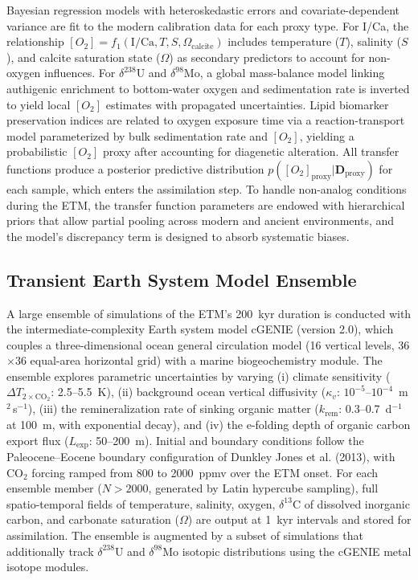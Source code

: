 \documentclass{article}
\begin{document}
Bayesian regression models with heteroskedastic errors and covariate-dependent variance are fit to the modern calibration data for each proxy type.
For I/Ca, the relationship $[O_2] = f_1(\text{I/Ca}, T, S, \Omega_{\text{calcite}})$ includes temperature ($T$), salinity ($S$), and calcite saturation state ($\Omega$) as secondary predictors to account for non-oxygen influences.
For $\delta^{238}$U and $\delta^{98}$Mo, a global mass-balance model linking authigenic enrichment to bottom-water oxygen and sedimentation rate is inverted to yield local $[O_2]$ estimates with propagated uncertainties.
Lipid biomarker preservation indices are related to oxygen exposure time via a reaction-transport model parameterized by bulk sedimentation rate and $[O_2]$, yielding a probabilistic $[O_2]$ proxy after accounting for diagenetic alteration.
All transfer functions produce a posterior predictive distribution $p([O_2]_{\text{proxy}} | \mathbf{D}_{\text{proxy}})$ for each sample, which enters the assimilation step.
To handle non-analog conditions during the ETM, the transfer function parameters are endowed with hierarchical priors that allow partial pooling across modern and ancient environments, and the model’s discrepancy term is designed to absorb systematic biases.

\subsection{Transient Earth System Model Ensemble}

A large ensemble of simulations of the ETM’s 200~kyr duration is conducted with the intermediate-complexity Earth system model cGENIE (version 2.0), which couples a three-dimensional ocean general circulation model (16 vertical levels, 36$\times$36 equal-area horizontal grid) with a marine biogeochemistry module.
The ensemble explores parametric uncertainties by varying (i) climate sensitivity ($\Delta T_{2\times\text{CO}_2}$: 2.5--5.5~K), (ii) background ocean vertical diffusivity ($\kappa_v$: $10^{-5}$--$10^{-4}$~m$^2$\,s$^{-1}$), (iii) the remineralization rate of sinking organic matter ($k_{\text{rem}}$: 0.3--0.7~d$^{-1}$ at 100~m, with exponential decay), and (iv) the e-folding depth of organic carbon export flux ($L_{\text{exp}}$: 50--200~m).
Initial and boundary conditions follow the Paleocene--Eocene boundary configuration of Dunkley Jones et al. (2013), with CO$_2$ forcing ramped from 800 to 2000~ppmv over the ETM onset.
For each ensemble member ($N > 2000$, generated by Latin hypercube sampling), full spatio-temporal fields of temperature, salinity, oxygen, $\delta^{13}$C of dissolved inorganic carbon, and carbonate saturation ($\Omega$) are output at 1~kyr intervals and stored for assimilation.
The ensemble is augmented by a subset of simulations that additionally track $\delta^{238}$U and $\delta^{98}$Mo isotopic distributions using the cGENIE metal isotope modules.
\end{document}
